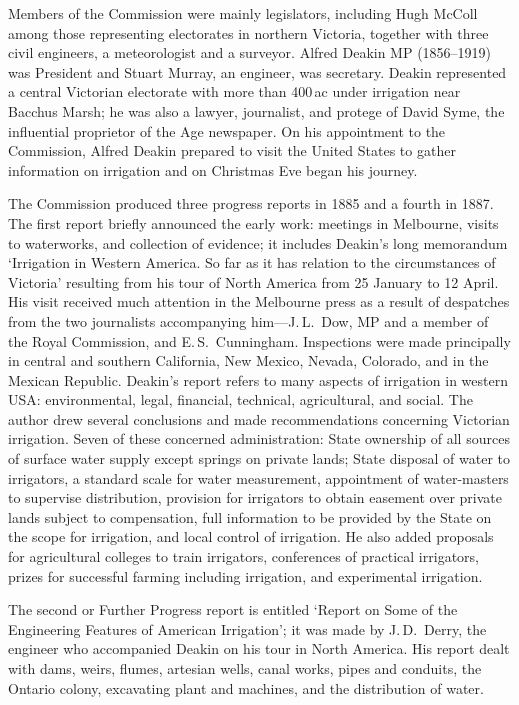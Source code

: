 Members of the Commission were mainly legislators, including Hugh
McColl among those representing electorates in northern Victoria,
together with three civil engineers, a meteorologist and a surveyor.
Alfred Deakin MP (1856--1919) was President and Stuart Murray, an
engineer, was secretary.  Deakin represented a central Victorian
electorate with more than 400\,ac under irrigation near Bacchus Marsh;
he was also a lawyer, journalist, and protege of David Syme, the
influential proprietor of the Age newspaper.  On his appointment to
the Commission, Alfred Deakin prepared to visit the United States to
gather information on irrigation and on Christmas Eve began his
journey.

The Commission produced three progress reports in 1885 and a fourth in
1887.  The first report briefly announced the early work: meetings in
Melbourne, visits to waterworks, and collection of evidence; it
includes Deakin's long memorandum `Irrigation in Western America. So
far as it has relation to the circumstances of Victoria' resulting
from his tour of North America from 25 January to 12 April.  His visit
received much attention in the Melbourne press as a result of
despatches from the two journalists accompanying him---J.\,L.~Dow, MP
and a member of the Royal Commission, and E.\,S.~Cunningham.
Inspections were made principally in central and southern California,
New Mexico, Nevada, Colorado, and in the Mexican Republic.  Deakin's
report refers to many aspects of irrigation in western USA:
environmental, legal, financial, technical, agricultural, and social.
The author drew several conclusions and made recommendations
concerning Victorian irrigation.  Seven of these concerned
administration: State ownership of all sources of surface water supply
except springs on private lands; State disposal of water to
irrigators, a standard scale for water measurement, appointment of
water-masters to supervise distribution, provision for irrigators to
obtain easement over private lands subject to compensation, full
information to be provided by the State on the scope for irrigation,
and local control of irrigation.  He also added proposals for
agricultural colleges to train irrigators, conferences of practical
irrigators, prizes for successful farming including irrigation, and
experimental irrigation.

The second or Further Progress report is entitled `Report on Some of
the Engineering Features of American Irrigation'; it was made by
J.\,D.~Derry, the engineer who accompanied Deakin on his tour in North
America.  His report dealt with dams, weirs, flumes, artesian wells,
canal works, pipes and conduits, the Ontario colony, excavating plant
and machines, and the distribution of water.

